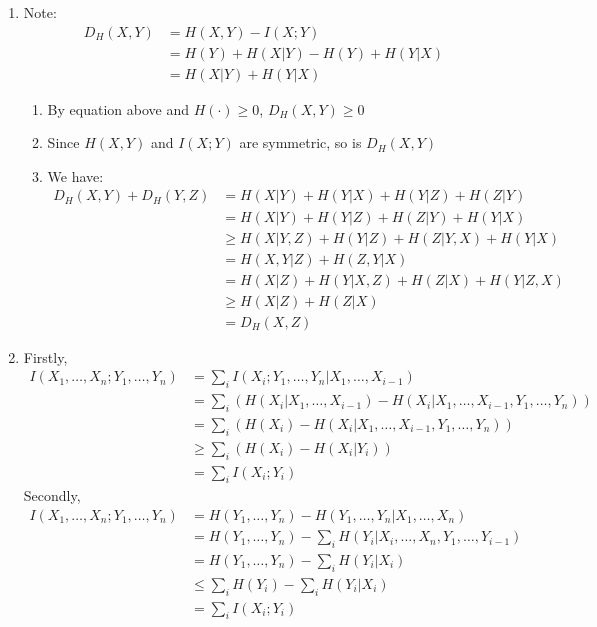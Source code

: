 \documentclass[12pt, a4paper]{article}
\begin{document}
\begin{enumerate}[Q\arabic*.]
  \item Note:
    \begin{align*}
      D_H(X,Y) &= H(X,Y) - I(X;Y)\\ 
               &= H(Y) + H(X|Y) - H(Y) + H(Y|X)\\ 
               &= H(X|Y) + H(Y|X)
    \end{align*}
    \begin{enumerate}
      \item By equation above and $H(\cdot )\geq 0$, $D_H(X,Y) \geq 0$
      \item Since $H(X,Y)$ and $I(X;Y)$ are symmetric, so is $D_H(X,Y)$
      \item We have:
        \begin{align*}
          D_H(X,Y) + D_H(Y,Z) &= H(X|Y) + H(Y|X) + H(Y|Z) + H(Z|Y)\\ 
                              &= H(X|Y) + H(Y|Z) + H(Z|Y) + H(Y|X)\\ 
                              &\geq H(X|Y,Z) + H(Y|Z) + H(Z|Y,X) + H(Y|X)\\ 
                              &= H(X,Y|Z) + H(Z,Y|X)\\ 
                              &= H(X|Z) + H(Y|X,Z) + H(Z|X) + H(Y|Z,X)\\ 
                              &\geq H(X|Z) + H(Z|X)\\ 
                              &= D_H(X,Z)
        \end{align*}
    \end{enumerate}

    \pagebreak
  \item Firstly,
    \begin{align*}
      I(X_1,\dots,X_n;Y_1,\dots,Y_n) &= \sum_i I(X_i ; Y_1,\dots,Y_n |X_1,\dots,X_{i-1})\\ 
                                     &= \sum_i \left(H(X_i|X_1,\dots,X_{i-1}) - H(X_i|X_1,\dots,X_{i-1},Y_1,\dots,Y_n)\right)\\ 
                                     &= \sum_i \left(H(X_i) - H(X_i|X_1,\dots,X_{i-1},Y_1,\dots,Y_n)\right)\\ 
                                     &\geq \sum_i (H(X_i) - H(X_i|Y_i))\\ 
                                     &= \sum_i I(X_i;Y_i)
    \end{align*}
    Secondly, 
    \begin{align*}
      I(X_1,\dots,X_n;Y_1,\dots,Y_n) &= H(Y_1,\dots,Y_n) - H(Y_1,\dots,Y_n|X_1,\dots,X_n)\\ 
                                     &= H(Y_1,\dots,Y_n) - \sum_i H(Y_i |X_i,\dots,X_n,Y_1,\dots,Y_{i-1})\\ 
                                     &= H(Y_1,\dots,Y_n) - \sum_i H(Y_i|X_i)\\ 
                                     &\leq \sum_i H(Y_i) - \sum_i H(Y_i|X_i)\\
                                     &= \sum_i I(X_i;Y_i)
    \end{align*}


\end{enumerate}
\end{document}

